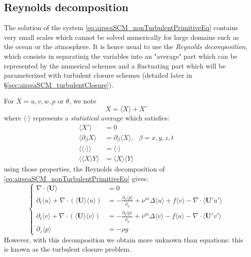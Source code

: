 \subsection{Reynolds decomposition}
The solution of the system \eqref{eq:airseaSCM_nonTurbulentPrimitiveEq}
contains very small scales which cannot be solved numerically for
large domains such as the ocean or the atmosphere. It is hence usual
to use the \textit{Reynolds decomposition}, which consists in
separatinig the variables into an "average" part which can be
represented by the numerical schemes and a fluctuating part which
will be parameterized with turbulent closure schemes
(detailed later in \S \ref{sec:airseaSCM_turbulentClosure}).
\par
For $X=u, v, w, p$ or $\theta$, we note
\begin{equation}
	X = \langle X\rangle + X'
\end{equation}
where $\langle \cdot \rangle$ represents a \textit{statistical}
average which satisfies:
\begin{equation}
\begin{aligned}
	\langle X' \rangle &= 0 \\
	\langle \partial_\beta X \rangle &=
	\partial_\beta \langle  X \rangle, ~~~\beta=x,y,z,t \\
	\langle\langle \cdot \rangle\rangle &= \langle \cdot \rangle \\
	\langle \langle X \rangle Y\rangle &= \langle X \rangle\langle Y \rangle
\end{aligned}
\end{equation}
using those properties, the Reynolds decomposition of 
\eqref{eq:airseaSCM_nonTurbulentPrimitiveEq} gives:
\begin{equation}
	\label{eq:airseaSCM_TurbulentPrimitiveEq}
\begin{cases}
	\nabla \cdot \langle\mathbf{U}\rangle &= 0 \\
	\partial_t \langle u \rangle+ \nabla \cdot
	(\langle\mathbf{U}\rangle \langle u\rangle) &=
	- \frac{\partial_x \langle p\rangle}{\rho_0} +
	\nu^m \Delta \langle u\rangle
	+ f \langle v\rangle - \nabla \cdot \langle
	\mathbf{U}' u'\rangle\\
	\partial_t \langle v\rangle + \nabla \cdot
	(\langle \mathbf{U}\rangle \langle v\rangle) &=
	- \frac{\partial_y \langle p\rangle}{\rho_0} +
	\nu^m \Delta \langle v\rangle
	- f \langle u\rangle  - \nabla \cdot \langle
	\mathbf{U}' v'\rangle\\
	\partial_z\langle p\rangle &= -\rho g
\end{cases}
\end{equation}
However, with this decomposition we obtain more unknown than
equations: this is known as the turbulent closure problem.

